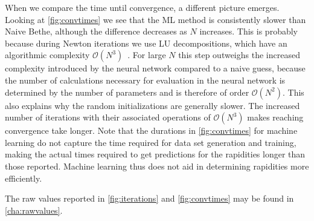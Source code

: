 \documentclass[11pt, a4paper]{report} %
\begin{document}
When we compare the time until convergence, a different picture emerges.
Looking at \cref{fig:convtimes} we see that the ML method is consistently slower than Naive Bethe, although the difference decreases as \(N\) increases.
This is probably because during Newton iterations we use LU decompositions, which have an algorithmic complexity \(\mathcal{O}(N^3)\)~\cite{Press2007}.
For large \(N\) this step outweighs the increased complexity introduced by the neural network compared to a naive guess, because the number of calculations necessary for evaluation in the neural network is determined by the number of parameters and is therefore of order \(\mathcal{O}(N^2)\).
This also explains why the random initializations are generally slower. 
The increased number of iterations with their associated operations of \(\mathcal{O}(N^3)\) makes reaching convergence take longer.
Note that the durations in \cref{fig:convtimes} for machine learning do not capture the time required for data set generation and training, making the actual times required to get predictions for the rapidities longer than those reported.
Machine learning thus does not aid in determining rapidities more efficiently.

The raw values reported in \cref{fig:iterations} and \cref{fig:convtimes} may be found in \cref{cha:rawvalues}.
\end{document}
